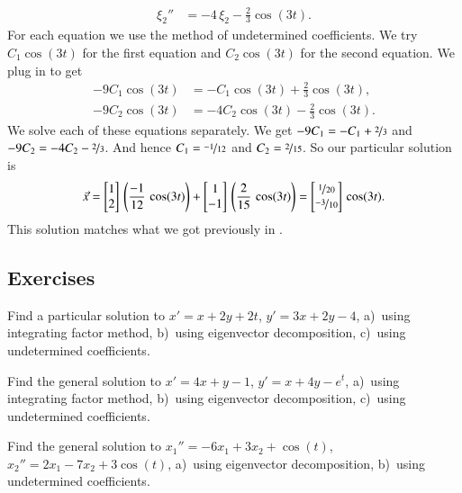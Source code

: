 \documentclass[12pt]{book}
\begin{document}
\begin{example}
\begin{align*}
\xi_2'' & = -4 \, \xi_2 - \frac{2}{3} \cos (3t) .
\end{align*}
For each equation we use the method of undetermined coefficients.
We 
try $C_1 \cos (3t)$ for the first equation and $C_2 \cos (3t)$ for the second
equation.  We plug in to get
\begin{align*}
- 9 C_1 \cos (3t) & = - C_1 \cos (3t) + \frac{2}{3} \cos (3t) , \\
- 9 C_2 \cos (3t) & = - 4 C_2 \cos (3t) - \frac{2}{3} \cos (3t) .
\end{align*}
We solve 
each of these equations separately.  We get
$- 9 C_1 = - C_1 + \nicefrac{2}{3}$ and
$- 9 C_2 = - 4C_2 - \nicefrac{2}{3}$.  And hence $C_1 = \nicefrac{-1}{12}$
and $C_2 = \nicefrac{2}{15}$.
So our particular solution is
\begin{equation*}
\vec{x} =
\begin{bmatrix} 1 \\
2 \end{bmatrix} \,
\left( \frac{-1}{12} \, \cos (3t) \right)
+
\begin{bmatrix} 1 \\
-1 \end{bmatrix} \,
\left( \frac{2}{15} \, \cos (3t) \right)
=
\begin{bmatrix} \nicefrac{1}{20} \\
\nicefrac{-3}{10} \end{bmatrix} \,
\cos (3t) .
\end{equation*}
This solution matches what we got previously in .
\end{example}

\subsection{Exercises}

\begin{exercise}
Find a particular solution to
$x' = x+ 2y +2t$, 
$y' = 3x + 2y -4$,
a)~using integrating factor method,
b)~using eigenvector decomposition,
c)~using undetermined coefficients.
\end{exercise}

\begin{exercise}
Find the general solution to
$x' = 4x+ y -1$, 
$y' = x + 4y -e^t$,
a)~using integrating factor method,
b)~using eigenvector decomposition,
c)~using undetermined coefficients.
\end{exercise}

\begin{exercise}
Find the general solution to
$x_1'' = -6x_1+ 3x_2 + \cos (t)$, 
$x_2'' = 2x_1 -7x_2 + 3\cos (t)$,
a)~using eigenvector decomposition,
b)~using undetermined coefficients.
\end{exercise}
\end{document}
